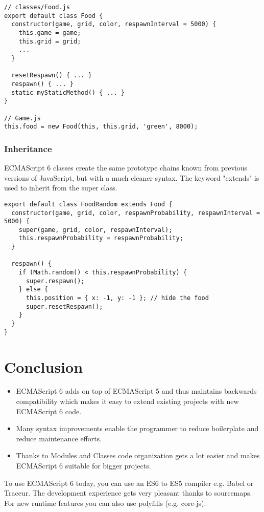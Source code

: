 \documentclass{bioinfo}
\begin{document}
\begin{lstlisting}[caption= My Javascript Example]
// classes/Food.js
export default class Food {
  constructor(game, grid, color, respawnInterval = 5000) {
    this.game = game;
    this.grid = grid;
    ...
  }

  resetRespawn() { ... }
  respawn() { ... }
  static myStaticMethod() { ... }
}

// Game.js
this.food = new Food(this, this.grid, 'green', 8000);
\end{lstlisting}

\subsubsection{Inheritance}
ECMAScript 6 classes create the same prototype chains known from previous versions of JavaScript, but with a much cleaner syntax. 
The keyword "extends" is used to inherit from the super class.

\begin{lstlisting}[caption= My Javascript Example]
export default class FoodRandom extends Food {
  constructor(game, grid, color, respawnProbability, respawnInterval = 5000) {
    super(game, grid, color, respawnInterval);
    this.respawnProbability = respawnProbability;
  }

  respawn() {
    if (Math.random() < this.respawnProbability) { 
      super.respawn();
    } else {
      this.position = { x: -1, y: -1 }; // hide the food
      super.resetRespawn();
    }
  }
}
\end{lstlisting}









\section{Conclusion}
\begin{itemize}
        \item ECMAScript 6 adds on top of ECMAScript 5 and thus maintains backwards compatibility which makes it easy to extend existing projects with new ECMAScript 6 code. 
        \item Many syntax improvements enable the programmer to reduce boilerplate and reduce maintenance efforts. 
        \item Thanks to Modules and Classes code organization gets a lot easier and makes ECMAScript 6 suitable for bigger projects.
\end{itemize}
To use ECMAScript 6 today, you can use an ES6 to ES5 compiler e.g. Babel or Traceur. The development experience gets
very pleasant thanks to sourcemaps. For new runtime features you can also use polyfills (e.g. core-js).
\end{document}
